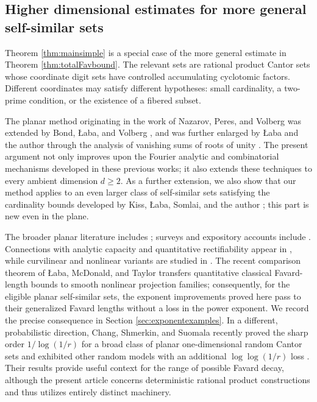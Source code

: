 \documentclass[12pt]{amsart}
\numberwithin{equation}{section}
\begin{document}
\subsection{Higher dimensional estimates for more general self-similar sets}
Theorem \ref{thm:mainsimple} is a special case of the more general estimate in Theorem \ref{thm:totalFavbound}.  The relevant sets are rational product Cantor sets whose coordinate digit sets have controlled accumulating cyclotomic factors.  Different coordinates may satisfy different hypotheses: small cardinality, a two-prime condition, or the existence of a fibered subset.

The planar method originating in the work of Nazarov, Peres, and Volberg \cite{NPV} was extended by Bond, {\L}aba, and Volberg \cite{BLV}, and was further enlarged by {\L}aba and the author through the analysis of vanishing sums of roots of unity \cite{LM}.  The present argument not only improves upon the Fourier analytic and combinatorial mechanisms developed in these previous works; it also extends these techniques to every ambient dimension $d\geq2$.  As a further extension, we also show that our method applies to an even larger class of self-similar sets satisfying the cardinality bounds developed by Kiss, {\L}aba, Somlai, and the author \cite{KLMS}; this part is new even in the plane.

The broader planar literature includes \cite{BV,BThesis,BLV,BV1,BV3,Bongers,CDOV,LZ,NPV,Tao,VV,Wilson,Zhang}; surveys and expository accounts include \cite{L1,PS1}.  Connections with analytic capacity and quantitative rectifiability appear in \cite{DV,To,Dab}, while curvilinear and nonlinear variants are studied in \cite{BV2,BT,CDT,LMT}.  The recent comparison theorem of {\L}aba, McDonald, and Taylor \cite{LMT} transfers quantitative classical Favard-length bounds to smooth nonlinear projection families; consequently, for the eligible planar self-similar sets, the exponent improvements proved here pass to their generalized Favard lengths without a loss in the power exponent.  We record the precise consequence in Section \ref{sec:exponentexamples}.  In a different, probabilistic direction, Chang, Shmerkin, and Suomala recently proved the sharp order $1/\log(1/r)$ for a broad class of planar one-dimensional random Cantor sets and exhibited other random models with an additional $\log\log(1/r)$ loss \cite{CSS}.  Their results provide useful context for the range of possible Favard decay, although the present article concerns deterministic rational product constructions and thus utilizes entirely distinct machinery.
\end{document}
